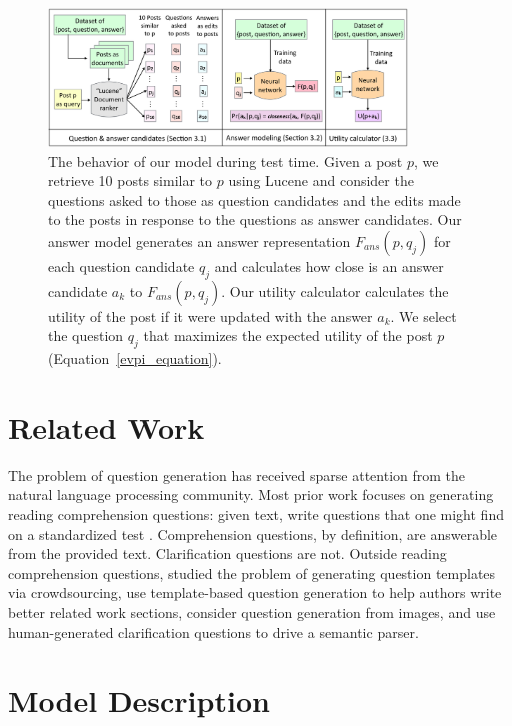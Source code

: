 \documentclass[11pt,a4paper]{article}
\begin{document}
\begin{figure}[t]
	\centering
	\includegraphics[width=0.85\textwidth]{model}
	\caption{\small The behavior of our model during test time. Given a post $p$, we retrieve 10 posts similar to $p$ using Lucene and consider the questions asked to those as question candidates and the edits made to the posts in response to the questions as answer candidates. Our answer model generates an answer representation $F_{ans}(p,q_j)$ for each question candidate $q_j$ and calculates how close is an answer candidate $a_k$ to $F_{ans}(p,q_j)$. Our utility calculator calculates the utility of the post if it were updated with the answer $a_k$. We select the question $q_j$ that maximizes the expected utility of the post $p$ (Equation~\ref{evpi_equation}).}
	\label{model}
	\vspace{-0.5em}
\end{figure}

\section{Related Work} \label{related_work}

The problem of question generation has received sparse attention from the natural language processing community. Most prior work focuses on generating reading comprehension questions:  given text, write questions that one might find on a standardized test \cite{vanderwende2008importance,heilman2011automatic,rus2011question}.  Comprehension questions, by definition, are answerable from the provided text. Clarification questions are not.  
Outside reading comprehension questions,  studied the problem of generating question templates via crowdsourcing,  use template-based question generation to help authors write better related work sections,  consider question generation from images, and   use human-generated clarification questions to drive a semantic parser.

\section{Model Description}\label{model}
\end{document}
